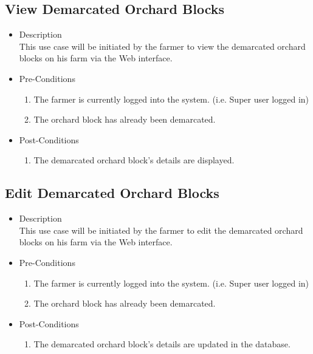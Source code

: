\documentclass[11pt,fleqn]{book} %
\begin{document}
	\subsection{View Demarcated Orchard Blocks}
	\begin{itemize}
		\item Description\\
		This use case will be initiated by the farmer to view the demarcated orchard blocks on his farm via the Web interface.
		\item Pre-Conditions
		\begin{enumerate}
			\item The farmer is currently logged into the system. (i.e. Super user logged in)
			\item The orchard block has already been demarcated.					
		\end{enumerate}
		\item Post-Conditions
		\begin{enumerate}
			\item The demarcated orchard block’s details are displayed.
		\end{enumerate}
	\end{itemize}
	
	\subsection{Edit Demarcated Orchard Blocks }
	\begin{itemize}
		\item Description\\
		This use case will be initiated by the farmer to edit the demarcated orchard blocks on his farm via the Web interface.
		\item Pre-Conditions
		\begin{enumerate}
			\item The farmer is currently logged into the system. (i.e. Super user logged in)
			\item The orchard block has already been demarcated.				
		\end{enumerate}
		\item Post-Conditions
		\begin{enumerate}
			\item The demarcated orchard block’s details are updated in the database.
		\end{enumerate}
	\end{itemize}
	
\end{document}
